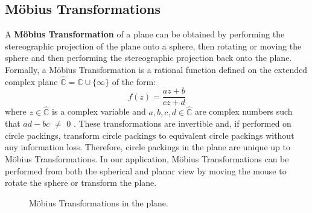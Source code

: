 \documentclass[11pt]{article}
\newcommand{\C}{\mathbb{C}}
\newcommand{\CP}{\hat{\mathbb{C}}}
\theoremstyle{definition}
\begin{document}
\subsection{M\"{o}bius Transformations}
 A \textbf{M\"{o}bius Transformation} of a plane can be obtained by performing the stereographic projection of the plane onto a sphere, then rotating or moving the sphere and then performing the stereographic projection back onto the plane. 
  Formally, a M\"{o}bius Transformation is a rational function defined on the extended complex plane $\CP = \C\cup\{\infty\}$ of the form:
  \begin{equation} 
  	f(z) = \frac{az+b}{cz+d}
  \end{equation}
  where $z\in\CP$ is a complex variable and $a,b,c,d\in\CP$ are complex numbers such that $ad - bc$ $\neq$ $0$ \cite{stephenson05introduction}. These transformations are invertible and, if performed on circle packings, transform circle packings to equivalent circle packings without any information loss. Therefore, circle packings in the plane are unique up to M\"{o}bius Transformations. In our application, M\"{o}bius Transformations can be performed from both the spherical and planar view by moving the mouse to rotate the sphere or transform the plane.
    \begin{figure}[h]%
	\centering
	\qquad
	\caption{M\"{o}bius Transformations in the plane.}%
	\label{fig:mobiusplane}%
\end{figure}
\end{document}
